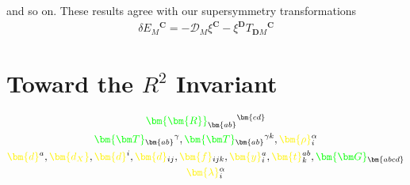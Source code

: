 \documentclass[letter,12pt]{article} %
\def\physical#1{ {\color{green} {\bm {#1}} } }
\def\auxiliary#1{ {\color{yellow} {\bm {#1}} } }
\def\FS#1{ { {\physical{\bm {#1}} } } }
\def\d{ \auxiliary{d_X} }
\def\dX{ \auxiliary{d} }
\def\dY{ \auxiliary{d} }
\def\dYY{ \auxiliary{d} }
\def\f{\auxiliary{f} }
\def\l{ \auxiliary{\lambda} }
\def\y{ \auxiliary{y} }
\def\t{ \auxiliary{t} }
\def\r{ \auxiliary{\rho} }
\def\Ga{\auxiliary{\bm \Gamma}}
\def\F{\bm F}
\def\Weyl{\physical W}
\def\G{ \physical{ {\bm G} } }
\def\Curvature{ \physical{ {\bm R} } }
\def\TorsionX{ \physical{ {\bm T} } }
\def\TorsionY{ \physical{ {\bm T} } }
\def\Curvature{ {\FS{R}} }
\begin{document}
and so on.
These results agree with our supersymmetry transformations 
\begin{align}
\delta E_M{}^{\bm C} = - \mathcal D_M \xi^{\bm C} - \xi^{\bm D} T_{\bm D M}{}^{\bm C}
\end{align}


\section{Toward the $R^2$ Invariant}

{%
\begin{gather}
\Curvature_{\bm{ab}}{}^{\bm {cd}} 
\cr
\TorsionX_{\bm {ab}}{}^\gamma,
\TorsionY_{\bm {ab}}{}^{\gamma k},
\r_i^\alpha 
\cr
\dX^a, 
\d, 
\dY^i, 
\dYY_{ij}, 
\f_{ijk},
\y_i^a,
\t_k^{ab},
\G_{\bm {abcd}}
\cr
\l_i^\alpha
\nonumber
\end{gather}
}
\end{document}
